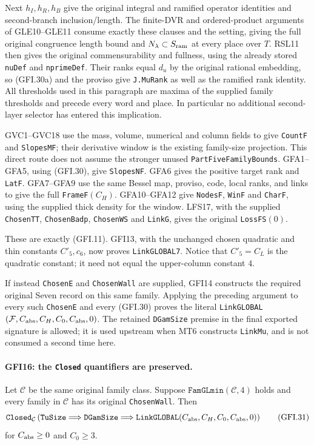 Next $h_I,h_R,h_B$ give the original integral and ramified operator
identities and second-branch inclusion/length.  The finite-DVR and
ordered-product arguments of GLE10--GLE11 consume exactly these
clauses and the setting, giving the full original congruence length
bound and $N_\lambda\subset S_{\rm ram}$ at every place over $T$.
RSL11 then gives the original commensurability and fullness, using
the already stored \texttt{nuDef} and \texttt{nprimeDef}.
Their ranks equal $d_u$ by the original rational embedding, so
(GFI.30a) and the proviso give \texttt{J.MuRank} as well as the
ramified rank identity.  All thresholds used in this paragraph are
maxima of the supplied family thresholds and precede every word
and place.  In particular no additional second-layer selector
has entered this implication.

GVC1--GVC18 use the mass, volume, numerical and column fields to
give \texttt{CountF} and \texttt{SlopesMF}; their derivative
window is the existing family-size projection.  This direct route
does not assume the stronger unused \texttt{PartFiveFamilyBounds}.
GFA1--GFA5, using (GFI.30), give \texttt{SlopesNF}.
GFA6 gives the positive target rank and \texttt{LatF}.
GFA7--GFA9 use the same Bessel map, proviso, code, local ranks,
and links to give the full \texttt{FrameF}$(C_H)$.
GFA10--GFA12 give \texttt{NodesF}, \texttt{WinF} and
\texttt{CharF}, using the supplied thick density for the window.
LFS17, with the supplied \texttt{ChosenTT},
\texttt{ChosenBadp}, \texttt{ChosenWS} and \texttt{LinkG}, gives
the original \texttt{LossFS}$(0)$.

These are exactly (GFI.11).  GFI13, with the unchanged chosen
quadratic and thin constants $C'_5,c_6$, now proves
\texttt{LinkGLOBAL7}.  Notice that $C'_5=C_L$ is the quadratic
constant; it need not equal the upper-column constant $4$.

If instead \texttt{ChosenE} and \texttt{ChosenWall} are supplied,
GFI14 constructs the required original Seven record on this same
family.  Applying the preceding argument to every such
\texttt{ChosenE} and every (GFI.30) proves the literal
\texttt{LinkGLOBAL}$(\mathcal F,C_{\rm abs},C_H,C_0,C_{\rm abs},0)$.
The retained \texttt{DGamSize} premise in the final exported
signature is allowed; it is used upstream when MT6 constructs
\texttt{LinkMu}, and is not consumed a second time here.

\paragraph{GFI16: the \texttt{Closed} quantifiers are preserved.}
\label{claim:GFI16}
Let $\mathcal C$ be the same original family class.  Suppose
$\texttt{FamGLmin}(\mathcal C,4)$ holds and every family in
$\mathcal C$ has its original \texttt{ChosenWall}.  Then
\[
 \texttt{Closed}_{\mathcal C}\left(
 \texttt{TuSize}\Longrightarrow\texttt{DGamSize}
 \Longrightarrow
 \texttt{LinkGLOBAL}(C_{\rm abs},C_H,C_0,C_{\rm abs},0)
 \right)                                                \tag{GFI.31}
\]
for $C_{\rm abs}\ge0$ and $C_0\ge3$.

